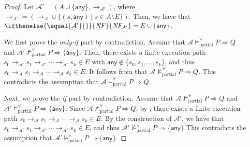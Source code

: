 \documentclass[10pt,a4paper]{article}
\def\cA{\mathcal{A}}
\newcommand{\symb}[1]{\mathsf{#1}}
\newcommand{\NF}[1][]{\ifthenelse{\equal{#1}{}}{\mathit{NF}}{\mathit{NF\!}_{#1}}}
\newcommand{\ReachPred}[2]{#1 \Rightarrow #2}
\newcommand{\Valid}[3]{#2 \mathrel{\mathrel{\models^\forall_{\mathrm{#1}}}} #3}
\newcommand{\NotValid}[3]{#2 \mathrel{\mathrel{\not\models^\forall_{\mathrm{#1}}}} #3}
\newcommand{\PartiallyValid}[2][\cA]{\Valid{partial}{#1}{#2}}
\newcommand{\NotPartiallyValid}[2][\cA]{\NotValid{partial}{#1}{#2}}
\begin{document}
\ThmSoundnessAndCompletenessOfUsingAny*
\begin{proof}
	Let $\cA'=(A\cup\{\symb{any}\}, \to_{\cA'})$, where ${\to_{\cA'}} = ({\to_\cA}\cup\{ (s,\symb{any}) \mid s \in A \setminus E \})$.
	Then, we have that $\NF[\cA']= E \cup \{\symb{any}\}$.

	We first
	prove the \textit{only-if} part by contradiction.
	Assume that $\PartiallyValid[\cA]{\ReachPred{P}{Q}}$ and
	$\NotPartiallyValid[\cA']{\ReachPred{P}{\{\symb{any}\}}}$.
	Then, there exists a finite execution path
	$s_0 \to_{\cA'} s_1 \to_{\cA'} \cdots \to_{\cA'} s_k \in E$ with
	$\symb{any} \notin \{s_0,s_1,\ldots,s_k\}$, and thus
	$s_0 \to_{\cA} s_1 \to_{\cA} \cdots \to_{\cA} s_k \in E$.
	It follows from  that $\NotPartiallyValid[\cA]{\ReachPred{P}{Q}}$.
	This contradicts the assumption that $\PartiallyValid[\cA]{\ReachPred{P}{Q}}$.

	Next, we prove the \textit{if} part by contradiction.
	Assume that $\NotPartiallyValid[\cA]{\ReachPred{P}{Q}}$ and
	$\PartiallyValid[\cA']{\ReachPred{P}{\{\symb{any}\}}}$.
	Since $\NotPartiallyValid[\cA]{\ReachPred{P}{Q}}$, by , there exists a finite execution path $s_0 \to_\cA s_1 \to_{\cA} \cdots \to_{\cA} s_k \in E$.
	By the construction of $\cA'$, we have that $s_0 \to_{\cA'} s_1 \to_{\cA'} \cdots \to_{\cA'} s_k \in E$, and thus $\NotPartiallyValid[\cA']{\ReachPred{P}{\{\symb{any}\}}}$
	This contradicts the assumption that $\PartiallyValid[\cA']{\ReachPred{P}{\{\symb{any}\}}}$.
\end{proof}
\end{document}
